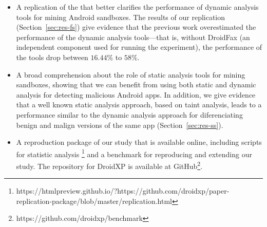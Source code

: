 \begin{itemize}
\item A replication of the \blls that better clarifies the performance of
  dynamic analysis tools for mining Android sandboxes. The results of
  our replication (Section~\ref{sec:res-fs})
  give evidence that the previous work overestimated
  the performance of the dynamic analysis tools---that is, without
  DroidFax (an independent component used for running the
  \blls experiment), the performance of the tools drop between $16.44$\% to $58$\%. 

\item A broad comprehension about the role of static analysis tools for mining
  sandboxes, showing that we can benefit from using both static and dynamic
  analysis for detecting malicious Android apps. In addition,
  we give evidence that a well known static analysis approach, based on
  taint analysis, leads to a performance similar to the dynamic analysis
  approach for diferenciating benign and malign versions of the same
  app (Section~\ref{sec:res-ss}).

\item A reproduction package of our study that is available online, including
  scripts for statistic analysis \footnote{https://htmlpreview.github.io/?https://github.com/droidxp/paper-replication-package/blob/master/replication.html}
  and a benchmark for reproducing and extending our study. The repository for DroidXP is available
at GitHub\footnote{https://github.com/droidxp/benchmark}.
 
\end{itemize}
